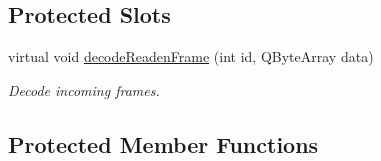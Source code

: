 \subsection*{Protected Slots}
\begin{DoxyCompactItemize}
\item 
virtual void \hyperlink{classmdt_device_a96be3ca9235561c58c69190e9ed45ca9}{decodeReadenFrame} (int id, QByteArray data)
\begin{DoxyCompactList}\small\item\em Decode incoming frames. \end{DoxyCompactList}\end{DoxyCompactItemize}
\subsection*{Protected Member Functions}
